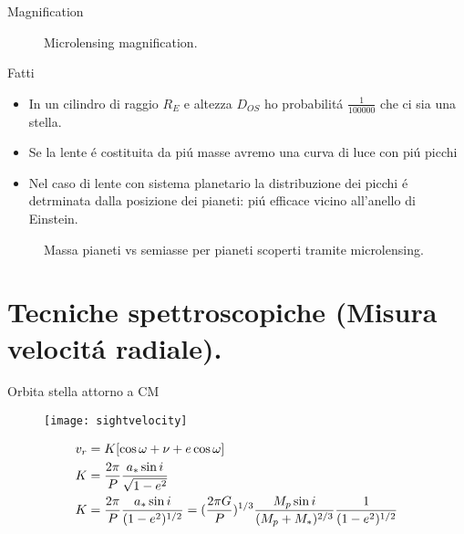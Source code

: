\begin{frame}{Magnification}
\begin{figure}[!ht]
\centering
\caption{Microlensing magnification.}
\end{figure}
\end{frame}

\begin{frame}{Fatti}
\begin{itemize}
    \item In un cilindro di raggio $R_E$ e altezza $D_{OS}$ ho probabilit\'a $\frac{1}{100000}$ che ci sia una stella.
    \item Se la lente \'e costituita da pi\'u masse avremo una curva di luce con pi\'u picchi
    \item Nel caso di lente con sistema planetario la distribuzione dei picchi \'e detrminata dalla posizione dei pianeti: pi\'u efficace vicino all'anello di Einstein.
\end{itemize}
\begin{figure}[!ht]
\centering
\caption{Massa pianeti vs semiasse per pianeti scoperti tramite microlensing.}
\end{figure}
\end{frame}

\section{Tecniche spettroscopiche (Misura velocit\'a radiale).}

\begin{frame}{Orbita stella attorno a CM}
\begin{figure}[!ht]\texttt{[image: sightvelocity]}\label{fig:sightvelocity}\end{figure}
\begin{align*}
&v_r=K[\cos{\omega+\nu}+e\cos{\omega}]\\
&K=\frac{2\pi}{P}\frac{a_*\sin{i}}{\sqrt{1-e^2}}\\
&K=\frac{2\pi}{P}\frac{a_*\sin{i}}{(1-e^2)^{1/2}}=(\frac{2\pi G}{P})^{1/3}\frac{M_p\sin{i}}{(M_p+M_*)^{2/3}}\frac{1}{(1-e^2)^{1/2}}
\end{align*}
\end{frame}

